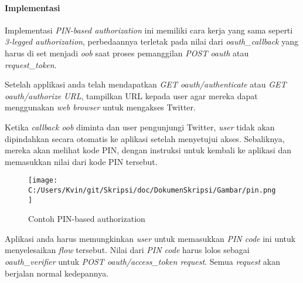 \paragraph{Implementasi}

Implementasi \textit{PIN-based authorization} ini memiliki cara kerja yang sama seperti \textit{3-legged authorization}, perbedaannya terletak pada nilai dari \textit{oauth\_callback} yang harus di set menjadi \textit{oob} saat proses pemanggilan \textit{POST oauth} atau \textit{request\_token}.

Setelah applikasi anda telah mendapatkan \textit{GET oauth/authenticate} atau \textit{GET oauth/authorize URL}, tampilkan URL kepada user agar mereka dapat menggunakan \textit{web browser} untuk mengakses Twitter.

Ketika \textit{callback oob} diminta dan user pengunjungi Twitter, \textit{user} tidak akan dipindahkan secara otomatis ke aplikasi setelah menyetujui akses. Sebaliknya, mereka akan melihat kode PIN, dengan instruksi untuk kembali ke aplikasi dan memasukkan nilai dari kode PIN tersebut.

\begin{figure}[H]
\centering
\texttt{[image: C:/Users/Kvin/git/Skripsi/doc/DokumenSkripsi/Gambar/pin.png]}
\caption{Contoh PIN-based authorization}
	\label{fig:pin}
\end{figure}

Aplikasi anda harus memungkinkan \textit{user} untuk memasukkan \textit{PIN code} ini untuk menyelesaikan \textit{flow} tersebut. Nilai dari \textit{PIN code} harus lolos sebagai \textit{oauth\_verifier} untuk \textit{POST oauth/access\_token request}. Semua \textit{request} akan berjalan normal kedepannya.





